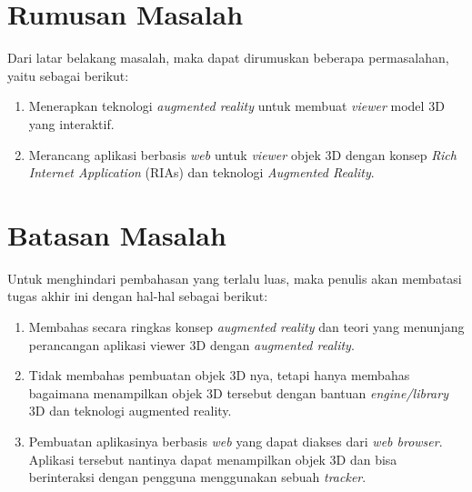 \section{Rumusan Masalah} %
\label{rumusan}
Dari latar belakang masalah, maka dapat dirumuskan beberapa permasalahan, yaitu sebagai berikut:
\begin{enumerate}
\item Menerapkan teknologi \textit{augmented reality} untuk membuat \textit{viewer} model 3D yang interaktif.
\item Merancang aplikasi berbasis \textit{web} untuk \textit{viewer} objek 3D dengan konsep \textit{Rich Internet Application} (RIAs) dan teknologi \textit{Augmented Reality}.
\end{enumerate}

\section{Batasan Masalah} %
\label{batasan}
Untuk menghindari pembahasan yang terlalu luas, maka penulis akan membatasi tugas akhir ini dengan hal-hal sebagai berikut:
\begin{enumerate}
\item Membahas secara ringkas konsep \textit{augmented reality} dan teori  yang menunjang perancangan aplikasi viewer 3D dengan \textit{augmented reality}.
\item Tidak membahas pembuatan objek 3D nya, tetapi hanya membahas bagaimana menampilkan objek 3D tersebut dengan bantuan \textit{engine/library} 3D dan teknologi augmented reality.
\item Pembuatan aplikasinya berbasis \textit{web} yang dapat diakses dari \textit{web browser}. Aplikasi tersebut nantinya dapat menampilkan objek 3D dan bisa berinteraksi dengan pengguna menggunakan sebuah \textit{tracker}.
\end{enumerate}

\pagebreak

